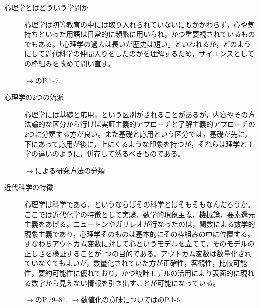 \begin{description}

	\item[心理学とはどういう学問か] 心理学は初等教育の中には取り入れられていないにもかかわらず，心や気持ちといった用語は日常的に頻繁に用いられ，かつ重要視されているものでもある。「心理学の過去は長いが歴史は短い」といわれるが，どのようにして近代科学の仲間入りをしたのかを理解するため，サイエンスとしての枠組みを改めて問い直す。
	      \begin{flushright}
		      $\to$\textcite{Miura201705}のP.1--7.
	      \end{flushright}

	\item[心理学の2つの流派] 心理学には基礎と応用，という区別がされることがあるが，内容やその方法論的な区分から行けば実証主義的アプローチと了解主義的アプローチの2つに分類する方が良い。また基礎と応用という区分では，基礎が先に，下にあって応用が後に，上にくるような印象を持つが，それらは理学と工学の違いのように，併存して然るべきものである。
	      \begin{flushright}
		      $\to$\textcite{Shimoyama2001}による研究方法の分類
	      \end{flushright}

	\item[近代科学の特徴] 心理学は科学である，というならばその科学とはそもそもなんだろうか。ここでは近代化学の特徴として実験，数学的現象主義，機械論，要素還元主義をあげる。ニュートンやガリレオが行なったのは，関数による数学的現象主義であり，心理学そのものは基本的にその枠組みの中に位置する。すなわちアウトカム変数に対して心というモデルを立てて，そのモデルの正しさを検証することが1つの目的である。アウトカム変数は数量化されていなくてもよいが，数量化されていた方が正確性，客観性，比較可能性，要約可能性に優れており，かつ統計モデルの活用により表面的に現れる数字から見えない情報を引き出すことが可能になっている。
	      \begin{flushright}
		      $\to$\textcite{Miura201705}のP.79--81.
		      $\to$数値化の意味については\textcite{Kawabata201408}のP.1-6
	      \end{flushright}


\end{description}
